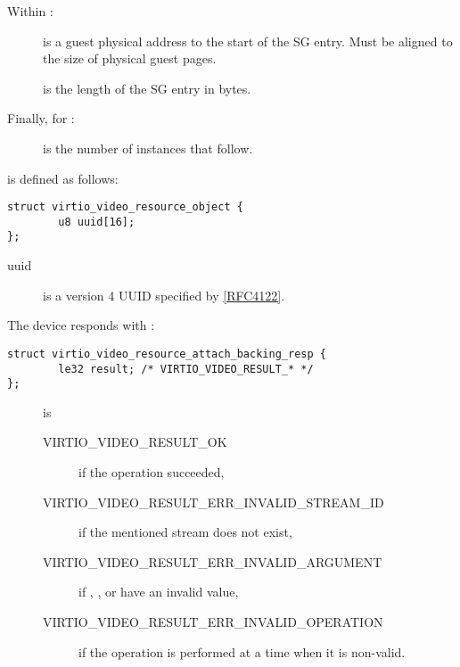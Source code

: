 Within :

\begin{description}
\item[]
is a guest physical address to the start of the SG entry. Must be
aligned to the size of physical guest pages.
\item[]
is the length of the SG entry in bytes.
\end{description}

Finally, for :

\begin{description}
\item[]
is the number of  instances
that follow.
\end{description}

 is defined as follows:

\begin{lstlisting}
struct virtio_video_resource_object {
        u8 uuid[16];
};
\end{lstlisting}

\begin{description}
\item[uuid]
is a version 4 UUID specified by \hyperref[intro:rfc4122]{[RFC4122]}.
\end{description}

The device responds with
:

\begin{lstlisting}
struct virtio_video_resource_attach_backing_resp {
        le32 result; /* VIRTIO_VIDEO_RESULT_* */
};
\end{lstlisting}

\begin{description}
\item[]
is

\begin{description}
\item[VIRTIO_VIDEO_RESULT_OK]
if the operation succeeded,
\item[VIRTIO_VIDEO_RESULT_ERR_INVALID_STREAM_ID]
if the mentioned stream does not exist,
\item[VIRTIO_VIDEO_RESULT_ERR_INVALID_ARGUMENT]
if , , or  have an
invalid value,
\item[VIRTIO_VIDEO_RESULT_ERR_INVALID_OPERATION]
if the operation is performed at a time when it is non-valid.
\end{description}
\end{description}


